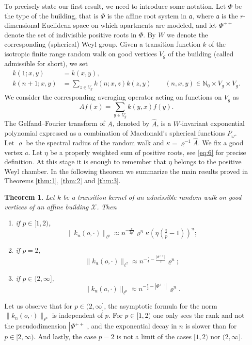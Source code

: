 \documentclass[11pt]{amsart}
\newcommand{\NN}{\mathbb{N}}
\theoremstyle{plain}
\newcounter{thm}
\newtheorem{main_theorem}[thm]{Theorem}
\theoremstyle{definition}
\numberwithin{equation}{section}
\begin{document}
To precisely state our first result, we need to introduce some notation. Let $\Phi$ be the type of the building, that is 
$\Phi$ is the affine root system in $\mathfrak{a}$, where $\mathfrak{a}$ is the $r$-dimensional Euclidean space on which 
apartments are modeled, and let $\Phi^{++}$ denote the set of indivisible positive roots in $\Phi.$ By $W$ we denote 
the corresponding (spherical) Weyl group. Given a transition function $k$ of the isotropic finite range random walk on 
good vertices $V_g$ of the building (called admissible for short), we set
\[
	\begin{aligned}
	k(1; x, y) &= k(x, y), \\
	k(n+1; x, y) &= \sum_{z \in V_g} k(n; x, z) k(z, y) \qquad (n, x, y) \in \NN_0 \times V_g \times V_g.
	\end{aligned}
\]
We consider the corresponding averaging operator acting on functions on $V_g$ as
\[
	A f(x)=\sum_{y \in V_g} k(y, x) f(y).
\]
The Gelfand--Fourier transform of $A$, denoted by $\hat{A}$, is a $W$-invariant exponential polynomial expressed 
as a combination of Macdonald's spherical functions $P_\omega$. Let $\varrho$ be the spectral radius of the random walk 
and $\kappa=\varrho^{-1}\widehat{A}$. We fix a good vertex $o$. Let $\eta$ be a properly weighted sum of positive roots,
see \eqref{eq:6} for precise definition. At this stage it is enough to remember that $\eta$ belongs to the positive Weyl
chamber. In the following theorem we summarize the main results proved in Theorems \ref{thm:1}, \ref{thm:2} and \ref{thm:3}.
\begin{main_theorem}
	\label{thm:A}
	Let $k$ be a transition kernel of an admissible random walk on good vertices of an affine building 
	$\mathscr{X}$. Then
	\begin{enumerate}[label=(\roman*), ref=\roman*]
		\item if $p \in [1, 2)$,
		\[
			\|k_n(o, \cdot)\|_{\ell^p}\approx n^{-\frac{r}{2p'}} 
			\varrho^{n} \kappa\left(\eta\left(\tfrac{2}{p}-1\right)\right)^{n};
		\]
		\item if $p=2$,
		\[
			\|k_n(o, \cdot)\|_{\ell^2}\approx n^{-\frac{r}{4}-\frac{|\Phi^{++}|}{2}} \varrho^{n};
		\]
		\item if $p \in (2, \infty]$,
		\[
			\|k_n(o, \cdot)\|_{\ell^p} \approx n^{-\frac{r}{2}-|\Phi^{++}|} \varrho^{n}.
		\]
	\end{enumerate}
\end{main_theorem} 
Let us observe that for $p \in (2, \infty]$, the asymptotic formula for the norm $\|k_n(o, \cdot)\|_{\ell^p}$
is independent of $p$. For $p \in [1, 2)$ one only sees the rank and not the pseudodimension $|\Phi^{++}|$, and the exponential 
decay in $n$ is slower than for $p \in [2, \infty)$. And lastly, the case $p = 2$ is not a limit of the cases $[1, 2)$ nor 
$(2, \infty]$.
\end{document}
